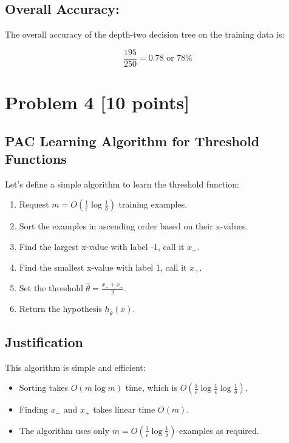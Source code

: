 \documentclass{article}
\begin{document}
\subsection*{Overall Accuracy:}
The overall accuracy of the depth-two decision tree on the training data is:

\[ \frac{195}{250} = 0.78 \text{ or } 78\% \]

\section*{Problem 4 [10 points]}

\subsection*{PAC Learning Algorithm for Threshold Functions}

Let's define a simple algorithm to learn the threshold function:

\begin{enumerate}
    \item Request $m = O(\frac{1}{\epsilon} \log \frac{1}{\delta})$ training examples.
    \item Sort the examples in ascending order based on their x-values.
    \item Find the largest x-value with label -1, call it $x_{-}$.
    \item Find the smallest x-value with label 1, call it $x_{+}$.
    \item Set the threshold $\hat{\theta} = \frac{x_{-} + x_{+}}{2}$.
    \item Return the hypothesis $h_{\hat{\theta}}(x)$.
\end{enumerate}

\subsection*{Justification}

This algorithm is simple and efficient:
\begin{itemize}
    \item Sorting takes $O(m \log m)$ time, which is $O(\frac{1}{\epsilon} \log \frac{1}{\epsilon} \log \frac{1}{\delta})$.
    \item Finding $x_{-}$ and $x_{+}$ takes linear time $O(m)$.
    \item The algorithm uses only $m = O(\frac{1}{\epsilon} \log \frac{1}{\delta})$ examples as required.
\end{itemize}
\end{document}
